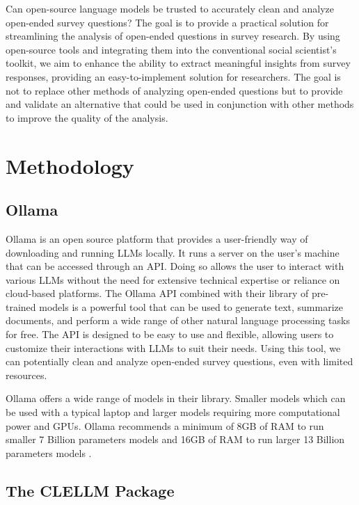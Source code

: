 \documentclass[
  authoryear,
  preprint,
  3p]{elsarticle}
\begin{document}
Can open-source language models be trusted to accurately clean and
analyze open-ended survey questions? The goal is to provide a practical
solution for streamlining the analysis of open-ended questions in survey
research. By using open-source tools and integrating them into the
conventional social scientist's toolkit, we aim to enhance the ability
to extract meaningful insights from survey responses, providing an
easy-to-implement solution for researchers. The goal is not to replace
other methods of analyzing open-ended questions but to provide and
validate an alternative that could be used in conjunction with other
methods to improve the quality of the analysis.

\section{Methodology}\label{methodology}

\subsection{Ollama}\label{ollama}

Ollama is an open source platform that provides a user-friendly way of
downloading and running LLMs locally. It runs a server on the user's
machine that can be accessed through an API. Doing so allows the user to
interact with various LLMs without the need for extensive technical
expertise or reliance on cloud-based platforms. The Ollama API combined
with their library of pre-trained models is a powerful tool that can be
used to generate text, summarize documents, and perform a wide range of
other natural language processing tasks for free. The API is designed to
be easy to use and flexible, allowing users to customize their
interactions with LLMs to suit their needs. Using this tool, we can
potentially clean and analyze open-ended survey questions, even with
limited resources.

Ollama offers a wide range of models in their library. Smaller models
which can be used with a typical laptop and larger models requiring more
computational power and GPUs. Ollama recommends a minimum of 8GB of RAM
to run smaller 7 Billion parameters models and 16GB of RAM to run larger
13 Billion parameters models \citep{ollama24}.

\subsection{The CLELLM Package}\label{the-clellm-package}
\end{document}
